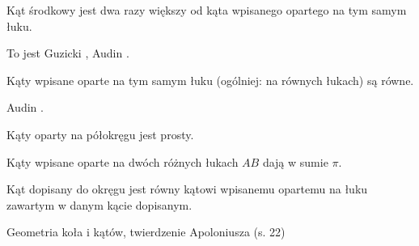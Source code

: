 
\begin{proposition}
    Kąt środkowy jest dwa razy większy od kąta wpisanego opartego na tym samym łuku.
\end{proposition}
To jest Guzicki \cite[s. 11]{guzicki_2021}, Audin \cite[s. 74]{audin_2003}.

\begin{corollary}
    Kąty wpisane oparte na tym samym łuku (ogólniej: na równych łukach) są równe.
\end{corollary}

Audin \cite[s. 75]{audin_2003}.

\begin{corollary}
    Kąty oparty na półokręgu jest prosty.
\end{corollary}

\begin{corollary}
    \label{ab_twice_pi}
    Kąty wpisane oparte na dwóch różnych łukach $AB$ dają w sumie $\pi$.
\end{corollary}

\begin{proposition}
    Kąt dopisany do okręgu jest równy kątowi wpisanemu opartemu na łuku zawartym w danym kącie dopisanym.
\end{proposition}


Geometria koła i kątów, twierdzenie Apoloniusza (s. 22)
